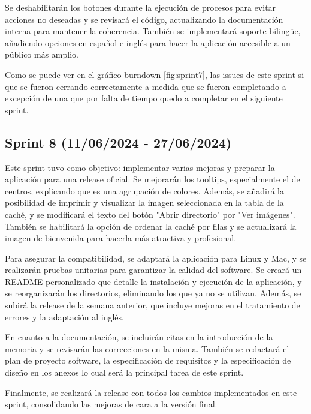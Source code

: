 Se deshabilitarán los botones durante la ejecución de procesos para evitar acciones no deseadas y se revisará el código, actualizando la documentación interna para mantener la coherencia. También se implementará soporte bilingüe, añadiendo opciones en español e inglés para hacer la aplicación accesible a un público más amplio.


Como se puede ver en el gráfico burndown \ref{fig:sprint7}, las issues de este sprint si que se fueron cerrando correctamente a medida que se fueron completando a excepción de una que por falta de tiempo quedo a completar en el siguiente sprint.


\subsection{Sprint 8 (11/06/2024 - 27/06/2024)}\label{sprint-8}

Este sprint tuvo como objetivo: implementar varias mejoras y preparar la aplicación para una release oficial. Se mejorarán los tooltips, especialmente el de centros, explicando que es una agrupación de colores. Además, se añadirá la posibilidad de imprimir y visualizar la imagen seleccionada en la tabla de la caché, y se modificará el texto del botón "Abrir directorio" por "Ver imágenes". También se habilitará la opción de ordenar la caché por filas y se actualizará la imagen de bienvenida para hacerla más atractiva y profesional.

Para asegurar la compatibilidad, se adaptará la aplicación para Linux y Mac, y se realizarán pruebas unitarias para garantizar la calidad del software. Se creará un README personalizado que detalle la instalación y ejecución de la aplicación, y se reorganizarán los directorios, eliminando los que ya no se utilizan. Además, se subirá la release de la semana anterior, que incluye mejoras en el tratamiento de errores y la adaptación al inglés.

En cuanto a la documentación, se incluirán citas en la introducción de la memoria y se revisarán las correcciones en la misma. También se redactará el plan de proyecto software, la especificación de requisitos y la especificación de diseño en los anexos lo cual será la principal tarea de este sprint. 

Finalmente, se realizará la release con todos los cambios implementados en este sprint, consolidando las mejoras de cara a la versión final.


